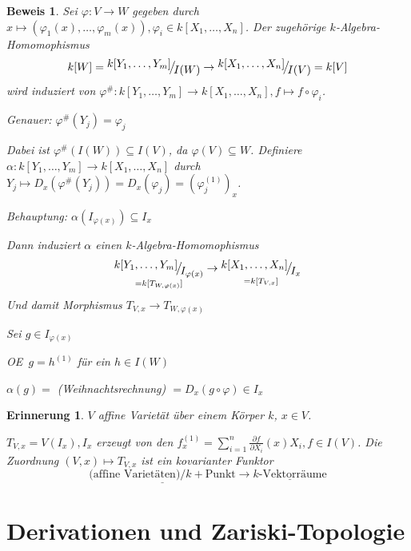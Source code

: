 \documentclass[a4paper, 12pt, numbers=noendperiod, chapterprefix=true, headsepline]{scrbook}
\theoremstyle{break}
\theoremstyle{nonumberbreak}
\newtheorem{nnErinn}{Erinnerung}
\newtheorem{Bew}{Beweis}
\theoremstyle{nonumberplain}
\newcommand{\Sum}{\sum\limits}
\newcommand{\FakRaum}[2]{
  \raisebox{0.7ex}{\ensuremath{#1}}
  \ensuremath{\mkern-3mu}\big/\ensuremath{\mkern-3mu}
  \raisebox{-0.6ex}{\ensuremath{#2}}}
\renewcommand{\OE}{O\!\!E~}
\begin{document}
\begin{Bew}
Sei $\varphi:V\to W$ gegeben durch $x\mapsto(\varphi_1(x),\ldots ,\varphi_m(x)), \varphi_i\in k[X_1,\ldots ,X_n]$. Der zugeh\"orige $k$-Algebra-Homomophismus
	\[k[W]=\FakRaum{k[Y_1,\ldots ,Y_m]}{I(W)}\to \FakRaum{k[X_1,\ldots ,X_n]}{I(V)}=k[V]\]
wird induziert von $\varphi^\#:k[Y_1,\ldots ,Y_m]\to k[X_1,\ldots ,X_n], f\mapsto f\circ \varphi_i$.

\emph{Genauer:} $\varphi^\#(Y_j)=\varphi_j$

Dabei ist $\varphi^\#(I(W))\subseteq I(V)$, da $\varphi(V)\subseteq W$. Definiere $\alpha: k[Y_1,\ldots ,Y_m]\to k[X_1,\ldots ,X_n]$ durch $Y_j\mapsto D_x(\varphi^\#(Y_j))=D_x(\varphi_j)=(\varphi_j^{(1)})_x$.

\emph{Behauptung:} $\alpha(I_{\varphi(x)})\subseteq I_x$

Dann induziert $\alpha$ einen $k$-Algebra-Homomophismus
	\[ \underset{=k[T_{W,\varphi(x)}]}{\FakRaum{k[Y_1,\ldots ,Y_m]}{I_{\varphi(x)}}} \to \underset{=k[T_{V,x}]}{\FakRaum{k[X_1,\ldots ,X_n]}{I_x}} \]
Und damit Morphismus $T_{V,x}\to T_{W,\varphi(x)}$

\begin{description}[\setlabelstyle{\itshape}]
\item[Beweis der Behauptung:]
	Sei $g\in I_{\varphi(x)}$

	\OE $g=h^{(1)}$ f\"ur ein $h\in I(W)$

	$\alpha(g) =$ (Weihnachtsrechnung) $= D_x(g\circ \varphi)\in I_x$
\end{description}
\end{Bew}

\begin{nnErinn}
$V$ affine Variet\"at \"uber einem K\"orper $k$, $x\in V$.

$T_{V,x} =V(I_x), I_x$ erzeugt von den $f_x^{(1)}=\Sum_{i=1}^n\frac{\partial f}{\partial X_i}(x)X_i, f\in I(V)$. Die Zuordnung $(V,x)\mapsto T_{V,x}$ ist ein kovarianter Funktor
	\[ \underline{\text{(affine Variet\"aten)}/k + \text{Punkt}} \to \underline{k\text{-Vektorr\"aume}}\]
\end{nnErinn}

\newpage


\section{Derivationen und Zariski-Topologie}
\end{document}
